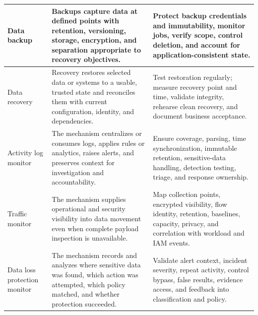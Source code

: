 \documentclass[11pt]{article}
\begin{document}
\begin{longtable}{@{}>{\RaggedRight\arraybackslash}p{}>{\RaggedRight\arraybackslash}p{}>{\RaggedRight\arraybackslash}p{}@{}}
Data backup & Backups capture data at defined points with retention, versioning, storage, encryption, and separation appropriate to recovery objectives. & Protect backup credentials and immutability, monitor jobs, verify scope, control deletion, and account for application-consistent state. \\\midrule
Data recovery & Recovery restores selected data or systems to a usable, trusted state and reconciles them with current configuration, identity, and dependencies. & Test restoration regularly; measure recovery point and time, validate integrity, rehearse clean recovery, and document business acceptance. \\\midrule
Activity log monitor & The mechanism centralizes or consumes logs, applies rules or analytics, raises alerts, and preserves context for investigation and accountability. & Ensure coverage, parsing, time synchronization, immutable retention, sensitive-data handling, detection testing, triage, and response ownership. \\\midrule
Traffic monitor & The mechanism supplies operational and security visibility into data movement even when complete payload inspection is unavailable. & Map collection points, encrypted visibility, flow identity, retention, baselines, capacity, privacy, and correlation with workload and IAM events. \\\midrule
Data loss protection monitor & The mechanism records and analyzes where sensitive data was found, which action was attempted, which policy matched, and whether protection succeeded. & Validate alert context, incident severity, repeat activity, control bypass, false results, evidence access, and feedback into classification and policy. \\\midrule
\bottomrule
\end{longtable}
\endgroup
\end{document}

